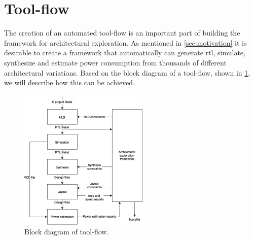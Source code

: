 \section{Tool-flow}
The creation of an automated tool-flow is an important part of building the framework for architectural exploration. As mentioned in \cref{sec:motivation} it is desirable to create a framework that automatically can generate \gls{rtl}, simulate, synthesize and estimate power consumption from thousands of different architectural variations. Based on the block diagram of a tool-flow, shown in \cref{fig:toolflowblock}, we will describe how this can be achieved. 
\begin{figure}[hbpt]
\centering
\includegraphics[width=0.55\textwidth]{../figs/Toolflow.png}
\caption{\label{fig:toolflowblock}Block diagram of tool-flow.}
\end{figure}
